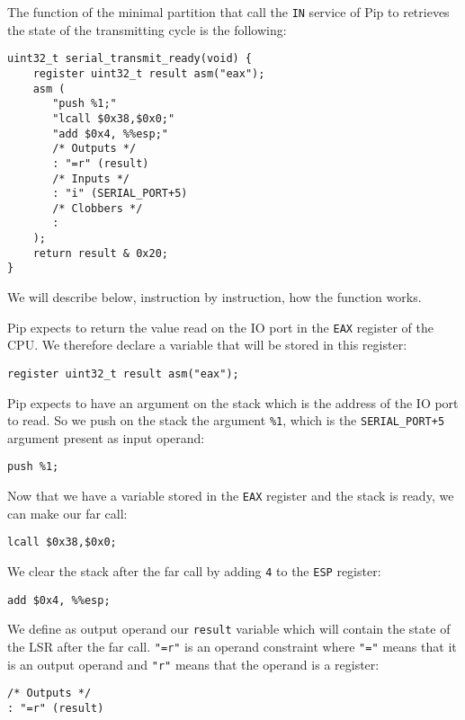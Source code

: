 \documentclass[10pt,a4paper,titlepage]{refart}
\begin{document}
The function of the minimal partition that call the \texttt{IN} service of Pip
to retrieves the state of the transmitting cycle is the following:

\begin{lstlisting}[style=CStyle]
uint32_t serial_transmit_ready(void) {
    register uint32_t result asm("eax");
    asm (
       "push %1;"
       "lcall $0x38,$0x0;"
       "add $0x4, %%esp;"
       /* Outputs */
       : "=r" (result)
       /* Inputs */
       : "i" (SERIAL_PORT+5)
       /* Clobbers */
       :
    );
    return result & 0x20;
}
\end{lstlisting}

We will describe below, instruction by instruction, how the function works.

Pip expects to return the value read on the IO port in the \texttt{EAX} register
of the CPU. We therefore declare a variable that will be stored in this
register:

\begin{lstlisting}[style=CStyle]
register uint32_t result asm("eax");
\end{lstlisting}

Pip expects to have an argument on the stack which is the address of the IO port
to read. So we push on the stack the argument \texttt{\%1}, which is the
\texttt{SERIAL\_PORT+5} argument present as input operand:

\begin{lstlisting}
push %1;
\end{lstlisting}

Now that we have a variable stored in the \texttt{EAX} register and the stack is
ready, we can make our far call:

\begin{lstlisting}
lcall $0x38,$0x0;
\end{lstlisting}

We clear the stack after the far call by adding \texttt{4} to the \texttt{ESP}
register:

\begin{lstlisting}
add $0x4, %%esp;
\end{lstlisting}

We define as output operand our \texttt{result} variable which will contain the
state of the LSR after the far call. \texttt{"=r"} is an operand constraint
where \texttt{"="} means that it is an output operand and \texttt{"r"} means that the
operand is a register:

\begin{lstlisting}[style=CStyle]
/* Outputs */
: "=r" (result)
\end{lstlisting}
\end{document}
